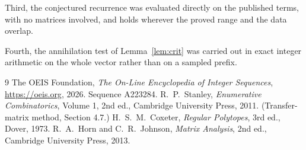 \documentclass[11pt,a4paper]{article}
\theoremstyle{plain}
\theoremstyle{definition}
\begin{document}
Third, the conjectured recurrence was evaluated directly on the published terms, with no
matrices involved, and holds wherever the proved range and the data overlap.

Fourth, the annihilation test of Lemma~\ref{lem:crit} was carried out in exact integer
arithmetic on the whole vector rather than on a sampled prefix.

\begin{thebibliography}{9}
 The OEIS Foundation, \emph{The On-Line Encyclopedia of Integer
Sequences}, \url{https://oeis.org}, 2026. Sequence A223284.
 R.~P.~Stanley, \emph{Enumerative Combinatorics}, Volume 1, 2nd ed.,
Cambridge University Press, 2011. (Transfer-matrix method, Section 4.7.)
 H.~S.~M.~Coxeter, \emph{Regular Polytopes}, 3rd ed., Dover, 1973.
 R.~A.~Horn and C.~R.~Johnson, \emph{Matrix Analysis}, 2nd ed., Cambridge
University Press, 2013.
\end{thebibliography}
\end{document}
